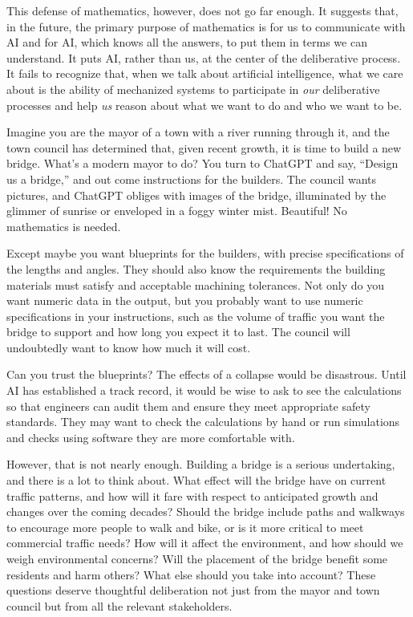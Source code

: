 \documentclass[11pt]{article}
\begin{document}
This defense of mathematics, however, does not go far enough. It suggests that, in the future, the primary purpose of mathematics is for us to communicate with AI and for AI, which knows all the answers, to put them in terms we can understand. It puts AI, rather than us, at the center of the deliberative process. It fails to recognize that, when we talk about artificial intelligence, what we care about is the ability of mechanized systems to participate in \emph{our} deliberative processes and help \emph{us} reason about what we want to do and who we want to be.

Imagine you are the mayor of a town with a river running through it, and the town council has determined that, given recent growth, it is time to build a new bridge. What's a modern mayor to do? You turn to ChatGPT and say, ``Design us a bridge,'' and out come instructions for the builders. The council wants pictures, and ChatGPT obliges with images of the bridge, illuminated by the glimmer of sunrise or enveloped in a foggy winter mist. Beautiful! No mathematics is needed.

Except maybe you want blueprints for the builders, with precise specifications of the lengths and angles. They should also know the requirements the building materials must satisfy and acceptable machining tolerances. Not only do you want numeric data in the output, but you probably want to use numeric specifications in your instructions, such as the volume of traffic you want the bridge to support and how long you expect it to last. The council will undoubtedly want to know how much it will cost.

Can you trust the blueprints? The effects of a collapse would be disastrous. Until AI has established a track record, it would be wise to ask to see the calculations so that engineers can audit them and ensure they meet appropriate safety standards. They may want to check the calculations by hand or run simulations and checks using software they are more comfortable with.

However, that is not nearly enough. Building a bridge is a serious undertaking, and there is a lot to think about. What effect will the bridge have on current traffic patterns, and how will it fare with respect to anticipated growth and changes over the coming decades? Should the bridge include paths and walkways to encourage more people to walk and bike, or is it more critical to meet commercial traffic needs? How will it affect the environment, and how should we weigh environmental concerns? Will the placement of the bridge benefit some residents and harm others? What else should you take into account? These questions deserve thoughtful deliberation not just from the mayor and town council but from all the relevant stakeholders.
\end{document}
